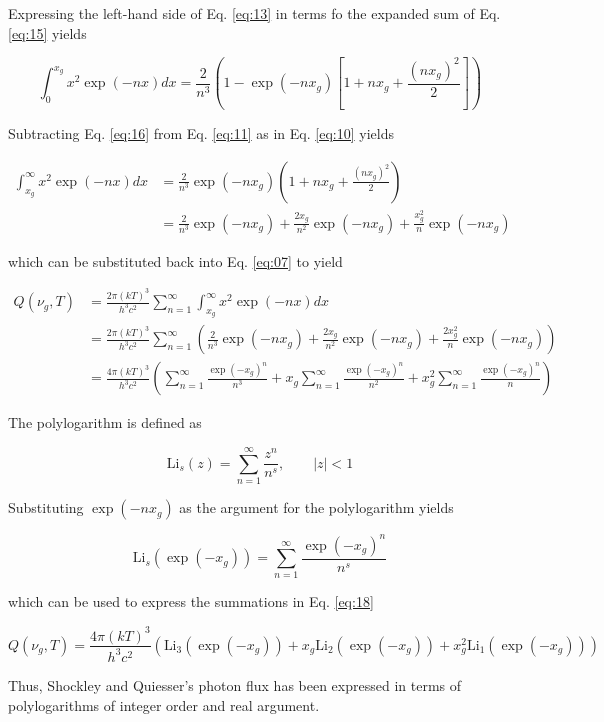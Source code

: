 \documentclass[letterpaper,12pt]{article}
\newcommand{\Li}{\textrm{Li}}
\begin{document}
\noindent Expressing the left-hand side of Eq. \ref{eq:13} in terms fo the expanded sum of Eq. \ref{eq:15} yields

\begin{equation} \label{eq:16}
\int_{0}^{x_{g}} x^{2} \exp(-nx) dx = \frac{2}{n^{3}} \left( 1 - \exp(-nx_{g}) \left[1 + nx_{g} + \frac{ (nx_{g})^{2} }{2} \right] \right)
\end{equation}

Subtracting Eq. \ref{eq:16} from Eq. \ref{eq:11} as in Eq. \ref{eq:10} yields

\begin{align} \label{eq:17}
\int_{x_{g}}^{\infty} x^{2} \exp(-nx) dx &= \frac{2}{n^{3}} \exp(-nx_{g}) \left( 1 + nx_{g} + \frac{ (nx_{g})^{2} }{2} \right) \\
 &= \frac{2}{n^{3}} \exp(-nx_{g}) + \frac{2x_{g}}{n^{2}} \exp(-nx_{g}) + \frac{x_{g}^{2}}{n} \exp(-nx_{g})
\end{align}

\noindent which can be substituted back into Eq. \ref{eq:07} to yield

\begin{align} \label{eq:18}
Q(\nu_{g}, T) &= \frac{2\pi (kT)^{3}}{h^{3} c^{2}} \sum_{n = 1}^{\infty} \int_{x_{g}}^{\infty} x^{2} \exp(-nx) dx \\
 &= \frac{2\pi (kT)^{3}}{h^{3} c^{2}} \sum_{n = 1}^{\infty} \left( \frac{2}{n^{3}} \exp(-nx_{g}) + \frac{2x_{g}}{n^{2}} \exp(-nx_{g}) + \frac{2x_{g}^{2}}{n} \exp(-nx_{g}) \right) \\
 &= \frac{4\pi (kT)^{3}}{h^{3} c^{2}} \left(\sum_{n = 1}^{\infty} \frac{\exp(-x_{g})^{n}}{n^{3}} + x_{g} \sum_{n = 1}^{\infty} \frac{\exp(-x_{g})^{n}}{n^{2}} + x_{g}^{2} \sum_{n = 1}^{\infty} \frac{\exp(-x_{g})^{n}}{n} \right)
\end{align}

The polylogarithm is defined as

\begin{equation} \label{eq:22}
\Li_{s}(z) = \sum_{n = 1}^{\infty} \frac{z^{n}}{n^{s}}, \qquad |z| < 1
\end{equation}

\noindent Substituting $\exp(-nx_{g})$ as the argument for the polylogarithm yields

\begin{equation} \label{eq:23}
\Li_{s} \left(\exp(-x_{g}) \right) = \sum_{n = 1}^{\infty} \frac{\exp(-x_{g})^{n}}{n^{s}}
\end{equation}

\noindent which can be used to express the summations in Eq. \ref{eq:18}

\begin{equation} \label{eq:24}
Q(\nu_{g}, T) = \frac{4\pi (kT)^{3}}{h^{3} c^{2}} \left(\Li_{3}(\exp(-x_{g})) + x_{g} \Li_{2}(\exp(-x_{g})) + x_{g}^{2} \Li_{1}(\exp(-x_{g})) \right) 
\end{equation}

\noindent Thus, Shockley and Quiesser's photon flux has been expressed in terms of polylogarithms of integer order and real argument.

% 
% 
\end{document}
